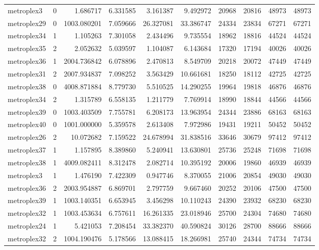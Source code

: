 \begin{longtable}{|l|r|r|r|r|r|r|r|r|r|}
metroplex3 & 0 & 1.686717 & 6.331585 & 3.161387 & 9.492972 & 20968 & 20816 & 48973 & 48973 \\
metroplex29 & 0 & 1003.080201 & 7.059666 & 26.327081 & 33.386747 & 24334 & 23834 & 67271 & 67271 \\
metroplex34 & 1 & 1.105263 & 7.301058 & 2.434496 & 9.735554 & 18962 & 18816 & 44524 & 44524 \\
metroplex35 & 2 & 2.052632 & 5.039597 & 1.104087 & 6.143684 & 17320 & 17194 & 40026 & 40026 \\
metroplex36 & 1 & 2004.736842 & 6.078896 & 2.470813 & 8.549709 & 20218 & 20072 & 47449 & 47449 \\
metroplex31 & 2 & 2007.934837 & 7.098252 & 3.563429 & 10.661681 & 18250 & 18112 & 42725 & 42725 \\
metroplex38 & 0 & 4008.871884 & 8.779730 & 5.510525 & 14.290255 & 19964 & 19818 & 46876 & 46876 \\
metroplex34 & 2 & 1.315789 & 6.558135 & 1.211779 & 7.769914 & 18990 & 18844 & 44566 & 44566 \\
metroplex39 & 0 & 1003.403509 & 7.755781 & 6.208173 & 13.963954 & 24344 & 23886 & 68163 & 68163 \\
metroplex40 & 0 & 1001.000000 & 5.359578 & 2.613408 & 7.972986 & 19431 & 19211 & 50452 & 50452 \\
metroplex26 & 2 & 10.072682 & 7.159522 & 24.678994 & 31.838516 & 33646 & 30679 & 97412 & 97412 \\
metroplex37 & 1 & 1.157895 & 8.389860 & 5.240941 & 13.630801 & 25736 & 25248 & 71698 & 71698 \\
metroplex38 & 1 & 4009.082411 & 8.312478 & 2.082714 & 10.395192 & 20006 & 19860 & 46939 & 46939 \\
metroplex3 & 1 & 1.476190 & 7.422309 & 0.947746 & 8.370055 & 21006 & 20854 & 49030 & 49030 \\
metroplex36 & 2 & 2003.954887 & 6.869701 & 2.797759 & 9.667460 & 20252 & 20106 & 47500 & 47500 \\
metroplex39 & 1 & 1003.140351 & 6.653945 & 3.456298 & 10.110243 & 24390 & 23932 & 68230 & 68230 \\
metroplex32 & 1 & 1003.453634 & 6.757611 & 16.261335 & 23.018946 & 25700 & 24304 & 74680 & 74680 \\
metroplex24 & 1 & 5.421053 & 7.208454 & 33.382370 & 40.590824 & 30126 & 28700 & 88666 & 88666 \\
metroplex32 & 2 & 1004.190476 & 5.178566 & 13.088415 & 18.266981 & 25740 & 24344 & 74734 & 74734 \\

\end{longtable}
